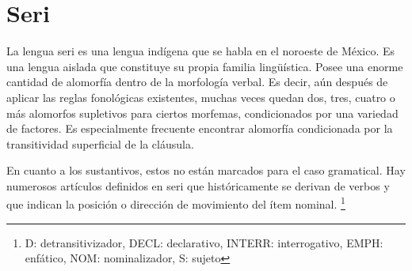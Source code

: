 \section*{Seri}

\noindent La lengua seri es una lengua indígena que se habla en el noroeste de México. Es una lengua aislada que constituye su propia familia lingüística. Posee una enorme cantidad de alomorfía dentro de la morfología verbal. Es decir, aún después de aplicar las reglas fonológicas existentes, muchas veces quedan dos, tres, cuatro o más alomorfos supletivos para ciertos morfemas, condicionados por una variedad de factores. Es especialmente frecuente encontrar alomorfía condicionada por la transitividad superficial de la cláusula.

En cuanto a los sustantivos, estos no están marcados para el caso gramatical. Hay numerosos artículos definidos en seri que históricamente se derivan de verbos y que indican la posición o dirección de movimiento del ítem nominal.
\footnote{D: detransitivizador, DECL: declarativo, INTERR: interrogativo, EMPH: enfático, NOM: nominalizador, S: sujeto}
\vspace{0.5cm}

